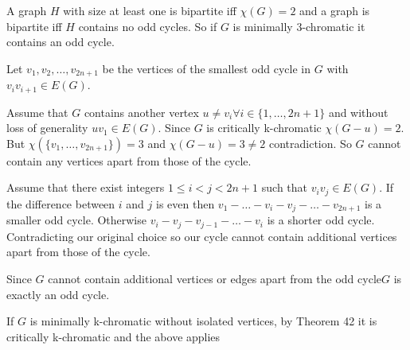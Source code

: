 A graph $H$ with size at least one is bipartite iff $\chi(G) = 2$ 
and a graph is bipartite iff $H$ contains no odd cycles. 
So if $G$ is minimally 3-chromatic it contains an odd cycle.

Let $v_1, v_2, \ldots, v_{2n+1}$ be the vertices of the smallest odd
cycle in $G$ with $v_iv_{i+1} \in E(G)$. 

Assume that $G$
contains another vertex $u \ne v_i \forall i \in \{1, \ldots, 2n+1\}$
and without loss of generality $uv_1 \in E(G)$. Since $G$ is
critically k-chromatic $\chi(G-u) = 2$. But $\chi(\{ v_1, \ldots, v_{2n+1} \}) = 3$
and $\chi(G-u) = 3 \ne 2$ contradiction. So $G$ cannot contain any
vertices apart from those of the cycle.

Assume that there exist integers $1 \le i < j < 2n+1$ such
that $v_iv_j \in E(G)$. If the difference between $i$ and $j$
is even then $v_1 - \ldots - v_i - v_j - \ldots - v_{2n+1}$
is a smaller odd cycle. Otherwise 
$v_i - v_j - v_{j-1} - \ldots -  v_i$ is a shorter odd cycle.
Contradicting our original choice so our cycle cannot contain
additional vertices apart from those of the cycle. 

Since $G$ cannot contain additional vertices or edges apart from the 
odd cycle$G$ is exactly an odd cycle.

If $G$ is minimally k-chromatic without isolated vertices, by Theorem
42 it is critically k-chromatic and the above applies
